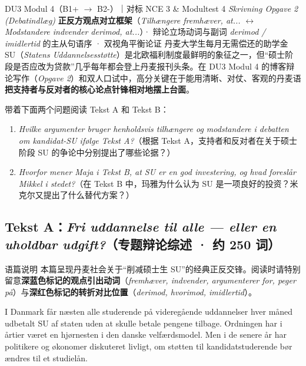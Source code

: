 {DU3 Modul 4（B1+ $\rightarrow$ B2-）｜对标 NCE 3 \& Modultest 4 \textit{Skrivning Opgave 2 (Debatindlæg)}}
{\textbf{正反方观点对立框架}（\textit{Tilhængere fremhæver, at...} $\leftrightarrow$ \textit{Modstandere indvender derimod, at...}）· 辩论立场动词与副词 \textit{derimod / imidlertid} 的主从句语序 · 双视角平衡论证}
{丹麦大学生每月无需偿还的助学金 SU（\textit{Statens Uddannelsesstøtte}）是北欧福利制度最鲜明的象征之一，但“硕士阶段是否应改为贷款”几乎每年都会登上丹麦报刊头条。在 DU3 Modul 4 的博客辩论写作（\textit{Opgave 2}）和双人口试中，高分关键在于能用清晰、对仗、客观的丹麦语\textbf{把支持者与反对者的核心论点针锋相对地摆上台面}。}

\begin{foerduleaeser}
带着下面两个问题阅读 Tekst A 和 Tekst B：
\begin{enumerate}
  \item \textit{Hvilke argumenter bruger henholdsvis tilhængere og modstandere i debatten om kandidat-SU ifølge Tekst A?}（根据 Tekst A，支持者和反对者在关于硕士阶段 SU 的争论中分别提出了哪些论据？）
  \item \textit{Hvorfor mener Maja i Tekst B, at SU er en god investering, og hvad foreslår Mikkel i stedet?}（在 Tekst B 中，玛雅为什么认为 SU 是一项良好的投资？米克尔又提出了什么替代方案？）
\end{enumerate}
\end{foerduleaeser}


\subsection*{Tekst A：\textit{Fri uddannelse til alle --- eller en uholdbar udgift?}（专题辩论综述 · 约 250 词）}

\begin{tipbox}{语篇说明}
本篇呈现丹麦社会关于“削减硕士生 SU”的经典正反交锋。阅读时请特别留意\textbf{\color{NCDNavy}深蓝色标记的观点引出动词}（\textit{fremhæver, indvender, argumenterer for, peger på}）与\textbf{\color{NCDRed}深红色标记的转折对比位置}（\textit{derimod, hvorimod, imidlertid}）。
\end{tipbox}

I Danmark får næsten alle studerende på videregående uddannelser hver måned udbetalt SU af staten uden at skulle betale pengene tilbage. Ordningen har i årtier været en hjørnesten i den danske velfærdsmodel. Men i de senere år har politikere og økonomer diskuteret livligt, om støtten til kandidatstuderende bør ændres til et studielån.

